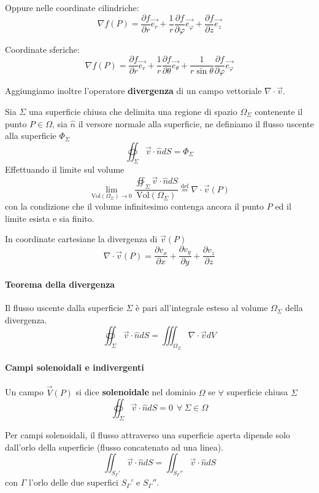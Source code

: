 Oppure nelle coordinate cilindriche:
$$
\nabla f(P) = \frac{\partial f}{\partial r}\vec{e_r} + \frac{1}{r}\frac{\partial f}{\partial \varphi}\vec{e_\varphi} + \frac{\partial f}{\partial z}\vec{e_z}
$$

Coordinate sferiche:
$$
\nabla f(P) = \frac{\partial f}{\partial r}\vec{e_r} + \frac{1}{r}\frac{\partial f}{\partial \theta}\vec{e_\theta} + \frac{1}{r\sin\theta} \frac{\partial f}{\partial \varphi}\vec{e_\varphi}
$$


Aggiungiamo inoltre l'operatore \textbf{divergenza} di un campo vettoriale $\nabla\cdot\vec{v}$.

Sia $\Sigma$ una superficie chiusa che delimita una regione di spazio $\Omega_\Sigma$ contenente 
il punto $P\in\Omega$, sia $\hat{n}$ il versore normale alla
superficie, ne definiamo il flusso uscente alla superficie $\Phi_\Sigma$
$$
\oiint_\Sigma \vec{v}\cdot \hat{n}dS = \Phi_\Sigma
$$
Effettuando il limite sul volume 
$$
\lim_{\text{Vol}(\Omega_\Sigma)\to 0} \frac{\oiint_\Sigma \vec{v}\cdot \hat{n}dS}{\text{Vol}(\Omega_\Sigma)}
\stackrel{\text{def}}{=} \nabla\cdot \vec{v}(P)
$$
con la condizione che il volume infinitesimo contenga ancora il punto $P$ ed il limite esista e 
sia finito.

In coordinate cartesiane la divergenza di $\vec{v}(P)$
$$
\nabla\cdot\vec{v}(P) = \frac{\partial v_x}{\partial x} + \frac{\partial v_y}{\partial y} + \frac{\partial v_z}{\partial z}  
$$


\paragraph{Teorema della divergenza}
Il flusso uscente dalla superficie $\Sigma$ è pari all'integrale esteso al volume 
$\Omega_\Sigma$ della divergenza.
$$
\oiint_\Sigma \vec{v}\cdot \hat{n} dS = \iiint_{\Omega_\Sigma} \nabla\cdot \vec{v} d V
$$

\paragraph{Campi solenoidali e indivergenti}

Un campo $\vec{V}(P)$ si dice \textbf{solenoidale} nel dominio $\Omega$ se $\forall$ superficie chiusa $\Sigma$
$$
\oiint_\Sigma \vec{v}\cdot \hat{n} dS = 0\ \ \forall\ \Sigma \in \Omega
$$

Per campi solenoidali, il flusso attraverso una superficie aperta dipende solo dall'orlo
della superficie (flusso concatenato ad una linea).
$$
\iint_{S_\Gamma'} \vec{v}\cdot\hat{n}dS = \iint_{S_\Gamma''} \vec{v}\cdot\hat{n}dS 
$$
con $\Gamma$ l'orlo delle due superfici $S_\Gamma'$ e $S_\Gamma''$.

